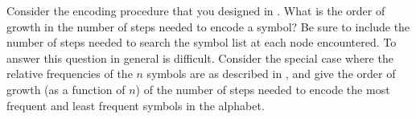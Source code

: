 \begin{exercise}
	\label{Exercise 2.72}
	Consider the encoding procedure that you designed in .
	What is the order of growth in the number of steps needed to encode a symbol?
	Be sure to include the number of steps needed to search the symbol list at each node encountered.
	To answer this question in general is difficult.
	Consider the special case where the relative frequencies of the \( n \) symbols are as described in , and give the order of growth (as a function of \( n \)) of the number of steps needed to encode the most frequent and least frequent symbols in the alphabet.
\end{exercise}
